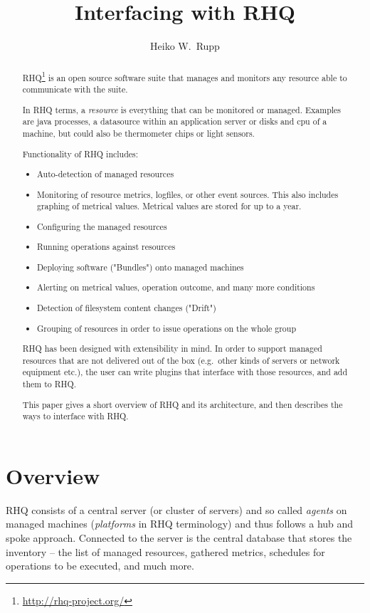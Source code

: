\documentclass[twocolumn,10pt,a4paper]{article}
\title{Interfacing with RHQ}
\author{Heiko W.\ Rupp}
\begin{document}
\sloppy
\maketitle



\begin{abstract}
RHQ\footnote{\url{http://rhq-project.org/}} is an open source software suite that manages and monitors any resource able to communicate with the suite.

In RHQ terms, a \emph{resource} 
is everything that can be monitored or managed. Examples are java processes, a datasource within an application server or disks and cpu of a machine, but could also be thermometer chips or light sensors.

Functionality of RHQ includes:
\begin{itemize}
\item Auto-detection of managed resources
\item Monitoring of resource metrics, logfiles, or other event sources. This also includes graphing of metrical values. Metrical values are stored for up to a year.
\item Configuring the managed resources
\item Running operations against resources
\item Deploying software ("Bundles") onto managed machines
\item Alerting on metrical values, operation outcome, and many more conditions
\item Detection of filesystem content changes ("Drift")
\item Grouping of resources in order to issue operations on the whole group
\end{itemize}

RHQ has been designed with extensibility in mind. 
In order to support managed resources that are not delivered out of the box 
(e.g.\ other kinds of servers or network equipment etc.), 
the user can write plugins that interface with those resources, and add them to RHQ.

This paper gives a short overview of RHQ and its architecture, and then
describes the ways to interface with RHQ.
\end{abstract}

\section{Overview}
RHQ consists of a central server (or cluster of servers) and so called
\emph{agents} on managed machines (\emph{platforms} in RHQ terminology) and thus
follows a hub and spoke approach. Connected to the server is the central
database that stores the inventory -- the list of managed resources, gathered
metrics, schedules for operations to be executed, and much more.
\end{document}
